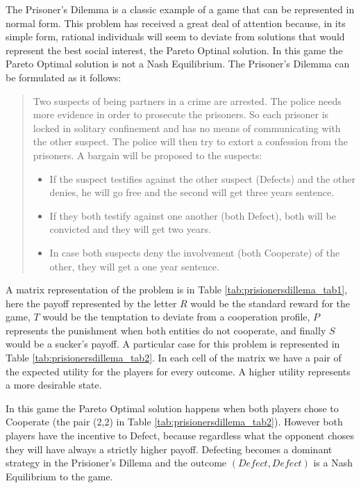 The Prisoner's Dilemma is a classic example of a game that can be represented
in normal form\cite{Osborne2004}. This problem has received a great deal of attention
because, in its simple form, rational individuals will seem to deviate
from solutions that would represent the best social interest,
the Pareto Optinal solution. In this game the Pareto Optimal solution
is not a Nash Equilibrium. The Prisoner's Dilemma can be formulated
as it follows:

\begin{quotation}

Two suspects of being partners in a crime are arrested. The police
needs more evidence in order to prosecute the prisoners. So each
prisoner is locked in solitary confinement and has no means of communicating
with the other suspect. The police will then try to extort a confession
from the prisoners. A bargain will be proposed to the suspects:
\begin{itemize}
\item If the suspect testifies against the other suspect (Defects) and the other denies, he will
go free and the second will get three years sentence.
\item If they both testify against one another (both Defect), both will
be convicted and they will get two years.
\item In case both suspects deny the involvement (both Cooperate) of the
other, they will get a one year sentence.
\end{itemize}
\end{quotation}

A matrix representation of the problem is in Table \ref{tab:prisionersdillema_tab1}, here the payoff represented by the letter $R$ would be the standard reward for the game, $T$ would be the temptation to deviate from a cooperation profile, $P$ represents the punishment when both entities do not cooperate, and finally $S$ would be a sucker's payoff. A particular case for this problem is represented in Table \ref{tab:prisionersdillema_tab2}. In each cell of the matrix we have a pair of the expected utility for the players for every outcome. A higher utility represents a more desirable state.

In this game the Pareto Optimal solution happens when both players chose to Cooperate (the pair (2,2) in Table \ref{tab:prisionersdillema_tab2}). However both players have the incentive to Defect, because regardless what the opponent choses they will have always a strictly higher payoff. Defecting becomes a dominant strategy in the Prisioner's Dillema and the outcome $(Defect, Defect)$ is a Nash Equilibrium to the game. 

